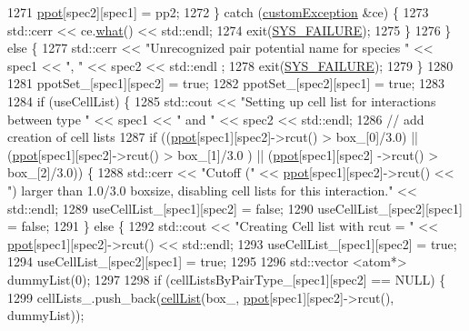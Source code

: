 \begin{DoxyCode}
1271             \hyperlink{classsim_system_ad2e290b5963f132e6a3a56cee35c8e9f}{ppot}[spec2][spec1] = pp2;
1272         \} \textcolor{keywordflow}{catch} (\hyperlink{classcustom_exception}{customException} &ce) \{
1273             std::cerr << ce.\hyperlink{classcustom_exception_aeb6ab5848b038adfc68fde86a512f691}{what}() << std::endl;
1274             exit(\hyperlink{global_8h_a428dfe1ef0a6ff4b1fdebf275f6aff2e}{SYS\_FAILURE});
1275         \}
1276     \} \textcolor{keywordflow}{else} \{
1277         std::cerr << \textcolor{stringliteral}{"Unrecognized pair potential name for species "} << spec1 << \textcolor{stringliteral}{", "} << spec2 << std::endl
      ;
1278         exit(\hyperlink{global_8h_a428dfe1ef0a6ff4b1fdebf275f6aff2e}{SYS\_FAILURE});
1279     \}
1280 
1281     ppotSet\_[spec1][spec2] = \textcolor{keyword}{true};
1282     ppotSet\_[spec2][spec1] = \textcolor{keyword}{true};
1283 
1284     \textcolor{keywordflow}{if} (useCellList) \{
1285         std::cout << \textcolor{stringliteral}{"Setting up cell list for interactions between type "} << spec1 << \textcolor{stringliteral}{" and "} << spec2 << 
      std::endl;
1286         \textcolor{comment}{// add creation of cell lists}
1287         \textcolor{keywordflow}{if} ((\hyperlink{classsim_system_ad2e290b5963f132e6a3a56cee35c8e9f}{ppot}[spec1][spec2]->rcut() > box\_[0]/3.0) || (\hyperlink{classsim_system_ad2e290b5963f132e6a3a56cee35c8e9f}{ppot}[spec1][spec2]->rcut() > box\_[1]/3.0
      ) || (\hyperlink{classsim_system_ad2e290b5963f132e6a3a56cee35c8e9f}{ppot}[spec1][spec2] ->rcut() > box\_[2]/3.0)) \{
1288             std::cerr << \textcolor{stringliteral}{"Cutoff ("} << \hyperlink{classsim_system_ad2e290b5963f132e6a3a56cee35c8e9f}{ppot}[spec1][spec2]->rcut() << \textcolor{stringliteral}{") larger than 1.0/3.0 boxsize,
       disabling cell lists for this interaction."} << std::endl;
1289             useCellList\_[spec1][spec2] = \textcolor{keyword}{false};
1290             useCellList\_[spec2][spec1] = \textcolor{keyword}{false};
1291         \} \textcolor{keywordflow}{else} \{
1292             std::cout << \textcolor{stringliteral}{"Creating Cell list with rcut = "} << \hyperlink{classsim_system_ad2e290b5963f132e6a3a56cee35c8e9f}{ppot}[spec1][spec2]->rcut() << std::endl;
1293             useCellList\_[spec1][spec2] = \textcolor{keyword}{true};
1294             useCellList\_[spec2][spec1] = \textcolor{keyword}{true};
1295 
1296             std::vector <atom*> dummyList(0);
1297 
1298             \textcolor{keywordflow}{if} (cellListsByPairType\_[spec1][spec2] == NULL) \{
1299                 cellLists\_.push\_back(\hyperlink{classcell_list}{cellList}(box\_, \hyperlink{classsim_system_ad2e290b5963f132e6a3a56cee35c8e9f}{ppot}[spec1][spec2]->rcut(), dummyList));

\end{DoxyCode}
